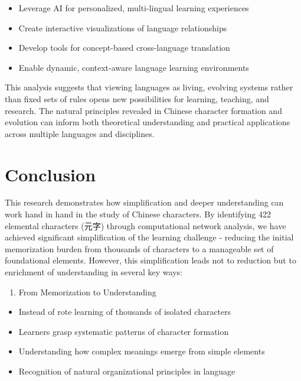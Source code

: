 \documentclass[11pt,letterpaper]{article}
\begin{document}
\begin{itemize}
\tightlist
\item
  Leverage AI for personalized, multi-lingual learning experiences
\item
  Create interactive visualizations of language relationships
\item
  Develop tools for concept-based cross-language translation
\item
  Enable dynamic, context-aware language learning environments
\end{itemize}

This analysis suggests that viewing languages as living, evolving
systems rather than fixed sets of rules opens new possibilities for
learning, teaching, and research. The natural principles revealed in
Chinese character formation and evolution can inform both theoretical
understanding and practical applications across multiple languages and
disciplines.

\section{Conclusion}\label{conclusion}

This research demonstrates how simplification and deeper understanding
can work hand in hand in the study of Chinese characters. By identifying
422 elemental characters (元字) through computational network analysis,
we have achieved significant simplification of the learning challenge -
reducing the initial memorization burden from thousands of characters to
a manageable set of foundational elements. However, this simplification
leads not to reduction but to enrichment of understanding in several key
ways:

\begin{enumerate}
\def\labelenumi{\arabic{enumi}.}
\tightlist
\item
  From Memorization to Understanding
\end{enumerate}

\begin{itemize}
\tightlist
\item
  Instead of rote learning of thousands of isolated characters
\item
  Learners grasp systematic patterns of character formation
\item
  Understanding how complex meanings emerge from simple elements
\item
  Recognition of natural organizational principles in language
\end{itemize}
\end{document}
